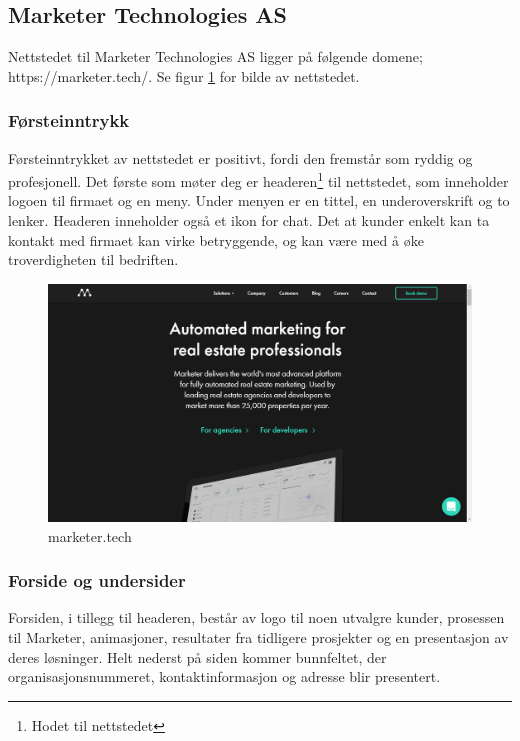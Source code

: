 \subsection{Marketer Technologies AS}
Nettstedet til Marketer Technologies AS ligger på følgende domene;
https://marketer.tech/. Se figur \ref{fig:competitors-marketer.tech} for bilde av nettstedet.

\subsubsection{Førsteinntrykk}
Førsteinntrykket av nettstedet er positivt, fordi den fremstår som ryddig og profesjonell. Det første som møter deg er headeren\footnote{Hodet til nettstedet} til nettstedet, som inneholder logoen til firmaet og en meny. Under menyen er en tittel, en underoverskrift og to lenker. Headeren inneholder også et ikon for chat. Det at kunder enkelt kan ta kontakt med firmaet kan virke betryggende, og kan være med å øke troverdigheten til bedriften.

\begin{figure}[H]
    \centering
    \includegraphics[width=\textwidth]{line/marketer_tech_(1366x768).png}
    \caption{marketer.tech}
    \label{fig:competitors-marketer.tech}
\end{figure}

\subsubsection{Forside og undersider}

Forsiden, i tillegg til headeren, består av logo til noen utvalgre kunder, prosessen til Marketer, animasjoner, resultater fra tidligere prosjekter og en presentasjon av deres løsninger. Helt nederst på siden kommer bunnfeltet, der organisasjonsnummeret, kontaktinformasjon og adresse blir presentert.

